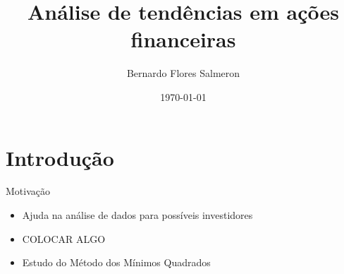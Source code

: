 \documentclass[10pt]{beamer}
\title{Análise de tendências em ações financeiras}
\date{\today}
\date{}
\author{Bernardo Flores Salmeron}
\institute{Universidade Federal da Bahia}
\newcommand{\themename}{\textbf{\textsc{metropolis}}\xspace}
\begin{document}
\maketitle


\section{Introdução}

\begin{frame}[fragile]{Motivação}

  \begin{itemize}
  \item Ajuda na análise de dados para possíveis investidores
  \newline
  \item COLOCAR ALGO
  \newline
  \item Estudo do Método dos Mínimos Quadrados 
  \newline
  \end{itemize}




\end{frame}
\end{document}
